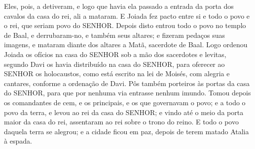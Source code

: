 {  Eles, pois, a detiveram, e logo que havia ela passado a entrada da porta dos cavalos da casa do rei, ali a mataram.
  E Joiada fez pacto entre si e todo o povo e o rei, que seriam povo do SENHOR.
  Depois disto entrou todo o povo no templo de Baal, e derrubaram-no, e também seus altares; e fizeram pedaços {} suas imagens, e mataram diante dos altares a Matã, sacerdote de Baal.
  Logo ordenou Joiada os ofícios na casa do SENHOR sob a mão dos sacerdotes e levitas, segundo Davi os havia distribuído na casa do SENHOR, para oferecer ao SENHOR os holocaustos, como está escrito na lei de Moisés, com alegria e cantares, conforme a ordenação de Davi.
  Pôs também porteiros às portas da casa do SENHOR, para que por nenhuma via entrasse nenhum imundo.
  Tomou depois os comandantes de cem, e os principais, e os que governavam o povo; e a todo o povo da terra, e levou ao rei da casa do SENHOR; e vindo até o meio da porta maior da casa do rei, assentaram ao rei sobre o trono do reino.
  E todo o povo daquela terra se alegrou; e a cidade ficou em paz, depois de terem matado Atalia à espada.
\par }

